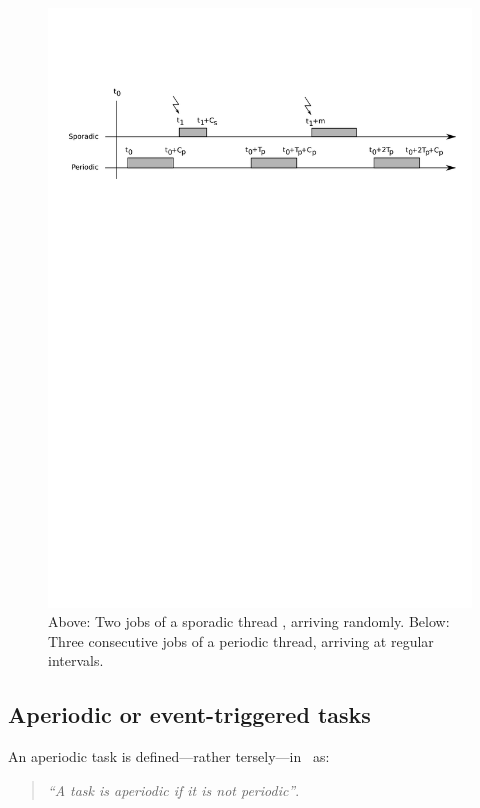 \begin{figure}
\centering
\includegraphics[scale=0.6]{figs/thread_timeline}
\caption{Above: Two jobs of a sporadic thread , arriving
  randomly. Below: Three consecutive jobs of a periodic thread,
  arriving at regular intervals.}
\label{fig:thread_timeline}
\end{figure}

\subsection{Aperiodic or event-triggered tasks}
An aperiodic task is defined---rather tersely---in~\cite{sha@rts04}
as:

\begin{quote}
\emph{``A task is aperiodic if it is not periodic''}. 
\end{quote}


